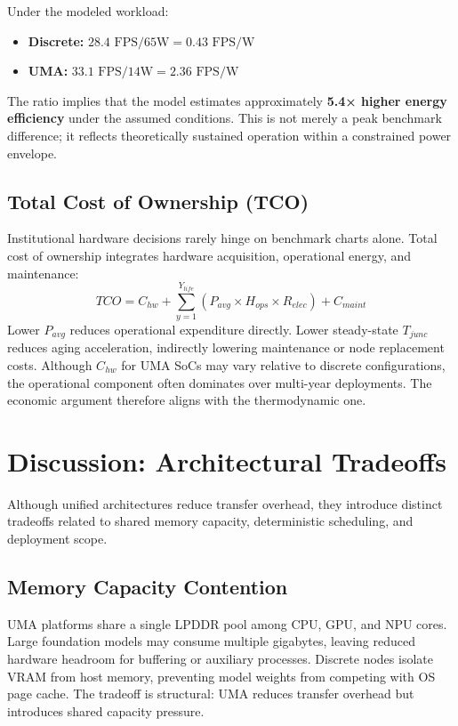 \documentclass[conference]{IEEEtran}
\begin{document}
Under the modeled workload:
\begin{itemize}
    \item \textbf{Discrete:} $28.4 \text{ FPS} / 65\text{W} = 0.43 \text{ FPS/W}$
    \item \textbf{UMA:} $33.1 \text{ FPS} / 14\text{W} = 2.36 \text{ FPS/W}$
\end{itemize}
The ratio implies that the model estimates approximately \textbf{5.4× higher energy efficiency} under the assumed conditions. This is not merely a peak benchmark difference; it reflects theoretically sustained operation within a constrained power envelope.

\subsection{Total Cost of Ownership (TCO)}
Institutional hardware decisions rarely hinge on benchmark charts alone. Total cost of ownership integrates hardware acquisition, operational energy, and maintenance:
\begin{equation}
TCO = C_{hw} + \sum_{y=1}^{Y_{life}} (P_{avg} \times H_{ops} \times R_{elec}) + C_{maint}
\end{equation}
Lower $P_{avg}$ reduces operational expenditure directly. Lower steady-state $T_{junc}$ reduces aging acceleration, indirectly lowering maintenance or node replacement costs. Although $C_{hw}$ for UMA SoCs may vary relative to discrete configurations, the operational component often dominates over multi-year deployments. The economic argument therefore aligns with the thermodynamic one.

\section{Discussion: Architectural Tradeoffs}

Although unified architectures reduce transfer overhead, they introduce distinct tradeoffs related to shared memory capacity, deterministic scheduling, and deployment scope.

\subsection{Memory Capacity Contention}
UMA platforms share a single LPDDR pool among CPU, GPU, and NPU cores. Large foundation models may consume multiple gigabytes, leaving reduced hardware headroom for buffering or auxiliary processes. Discrete nodes isolate VRAM from host memory, preventing model weights from competing with OS page cache. The tradeoff is structural: UMA reduces transfer overhead but introduces shared capacity pressure.
\end{document}
